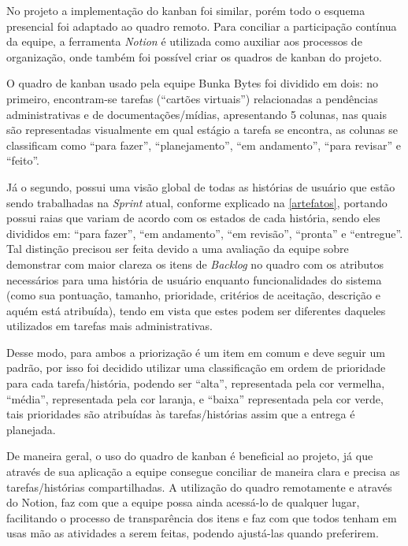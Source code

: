 No projeto  a implementação do kanban foi similar, porém todo o esquema presencial foi adaptado ao quadro remoto. Para conciliar a participação contínua da equipe, a ferramenta \textsl{Notion} é utilizada como auxiliar aos processos de organização, onde também foi possível criar os quadros de kanban do projeto. 

O quadro de kanban usado pela equipe Bunka Bytes foi dividido em dois: no primeiro, encontram-se tarefas (``cartões virtuais'') relacionadas a pendências administrativas e de documentações/mídias, apresentando 5 colunas, nas quais são representadas visualmente em qual estágio a tarefa se encontra, as colunas se classificam como ``para fazer'', ``planejamento'', ``em andamento'', ``para revisar'' e ``feito''.

Já o segundo, possui uma visão global de todas as histórias de usuário que estão sendo trabalhadas na \textsl{Sprint} atual, conforme explicado na \autoref{artefatos}, portando possui raias que variam de acordo com os estados de cada história, sendo eles divididos em: ``para fazer'', ``em andamento'', ``em revisão'', ``pronta'' e ``entregue''. Tal distinção precisou ser feita devido a uma avaliação da equipe sobre demonstrar com maior clareza os itens de \textsl{Backlog} no quadro com os atributos necessários para uma história de usuário enquanto funcionalidades do sistema (como sua pontuação, tamanho, prioridade, critérios de aceitação, descrição e aquém está atribuída), tendo em vista que estes podem ser diferentes daqueles utilizados em tarefas mais administrativas.

Desse modo, para ambos a priorização é um item em comum e deve seguir um padrão, por isso foi decidido utilizar uma classificação em ordem de prioridade para cada tarefa/história, podendo ser ``alta'', representada pela cor vermelha, ``média'', representada pela cor laranja, e ``baixa'' representada pela cor verde, tais prioridades são atribuídas às tarefas/histórias assim que a entrega é planejada.

De maneira geral, o uso do quadro de kanban é beneficial ao projeto, já que através de sua aplicação a equipe consegue conciliar de maneira clara e precisa as tarefas/histórias compartilhadas. A utilização do quadro remotamente e através do Notion, faz com que a equipe possa ainda acessá-lo de qualquer lugar, facilitando o processo de transparência dos itens e faz com que todos tenham em usas mão as atividades a serem feitas, podendo ajustá-las quando preferirem. 

